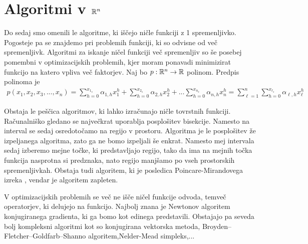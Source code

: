 \chapter{Algoritmi v $\mathbb{R}^n$}
Do sedaj smo omenili le algoritme, ki iščejo ničle funkciji z 1 spremenljivko. Pogosteje pa se znajdemo pri problemih funkciji, ki so odvisne od več spremenljivk. Algoritmi za iskanje ničel funkciji več spremenljiv so še posebej pomembni v optimizacijskih problemih, kjer moram ponavadi minimizirat funkcijo na katero vpliva več faktorjev. Naj bo $p: \mathbb{R}^n \to \mathbb{R}$ polinom. Predpis polinoma je
\begin{align}
    p(x_1, x_2, x_3, ..., x_n) = \sum_{h = 0}^{x_1_{s}} \alpha_{1,h} x_1^h + \sum_{h = 0}^{x_2_{s}} \alpha_{2,h} x_2^h + ... \sum_{h = 0}^{x_n_{s}} \alpha_{n,h} x_n^h = \sum_{\ell = 1}^n\sum_{h=0}^{x_{\ell}_s} \alpha_{\ell, h} x_\ell^h
\end{align}

Obstaja le peščica algoritmov, ki lahko izračunajo ničle tovrstnih funkciji. Računalniško gledano se največkrat uporablja posplošitev bisekcije. Namesto na interval se sedaj osredotočamo na regijo v prostoru. Algoritma je le posplošitev že izpeljanega algoritma, zato ga ne bomo izpeljali še enkrat. Namesto mej intervala sedaj izberemo mejne točke, ki predstavljajo regijo, tako da ima na mejnih točka funkcija nasprotna si predznaka, nato regijo manjšamo po vseh prostorskih spremenljivkah. Obstaja tudi algoritem, ki je posledica Poincare-Mirandovega izreka \cite{Kulpa1997}, vendar je algoritem zapleten.

V optimizacijskih problemih se več ne išče ničel funkcije odvoda, temveč operatorjev, ki delujejo na funkcijo. Najbolj znana je Newtonov algoritem konjugiranega gradienta, ki ga bomo kot edinega predstavili. Obstajajo pa seveda bolj kompleksni algoritmi kot so konjugirana vektorska metoda, Broyden–Fletcher–Goldfarb–Shanno algoritem,Nelder-Mead simpleks,... 

